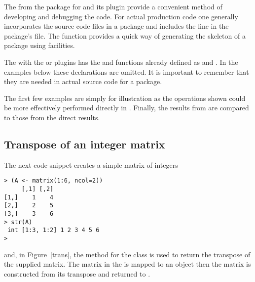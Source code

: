\documentclass[shortnames,article]{jss}
\begin{document}
The  from the  package \citep*{CRAN:inline} for
 and its  plugin provide a convenient method of
developing and debugging the  code.  For actual production code
one generally incorporates the  source code files in a package
and includes the line  in the package's
 file.  The  function
provides a quick way of generating the skeleton of a package using
 facilities.

The  with the  or 
plugins has the  and  functions already defined as
 and .  In the examples below
these declarations are omitted.  It is important to remember that they are
needed in actual  source code for a package.

The first few examples are simply for illustration as the operations
shown could be more effectively performed directly in .
Finally, the results from  are compared to those from the direct
 results.

\subsection{Transpose of an integer matrix}
\label{sec:transpose}

The next  code snippet creates a simple matrix of integers
\begin{verbatim}
> (A <- matrix(1:6, ncol=2))
     [,1] [,2]
[1,]    1    4
[2,]    2    5
[3,]    3    6
> str(A)
 int [1:3, 1:2] 1 2 3 4 5 6
> 
\end{verbatim}
and, in Figure~\ref{trans}, the  method for the
 class is used to return the transpose of the supplied matrix. The 
matrix in the   is mapped to an
 object then the matrix  is constructed
from its transpose and returned to .
\end{document}
